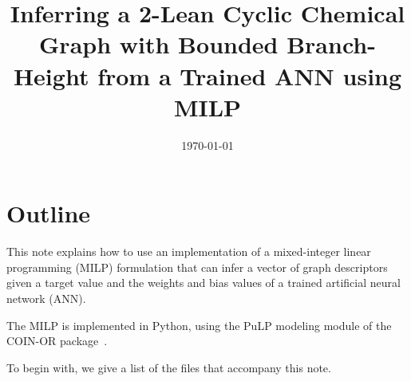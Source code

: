 \documentclass[11pt, titlepage, dvipdfmx, twoside]{article}
\title{\Huge{Inferring a 2-Lean Cyclic Chemical Graph with Bounded Branch-Height
			  from a Trained ANN using MILP}}
\begin{document}
\makeatletter 
\let\c@lstlisting\c@figure
\makeatother

\date{\today}

\maketitle


\thispagestyle{empty}
\tableofcontents
\clearpage



\section{Outline}
\label{sec:Intro}

This note explains how to use an implementation of a mixed-integer
linear programming (MILP) formulation that can infer
a vector of graph descriptors given a target value and the 
weights and bias values of a trained artificial neural network (ANN).

The MILP is implemented in Python, 
using the PuLP modeling module of the 
COIN-OR package~\cite{PuLP1,PuLP2,PuLP3,PuLP4}.

To begin with, we give a list of the files that accompany this note.
\end{document}
